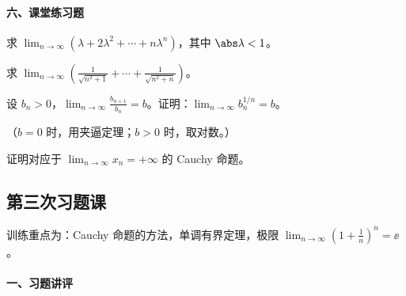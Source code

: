 \paragraph{六、课堂练习题}

\begin{xexercise}[1]
求 $\displaystyle\lim_{n\to\infty}(\lambda+2\lambda^2+\cdots+n\lambda^n)$，其中 $\abs\lambda<1$。
\end{xexercise}

\begin{xexercise}[2]
求 $\displaystyle\lim_{n\to\infty}\left(\frac1{\sqrt{n^2+1}}+\cdots+\frac1{\sqrt{n^2+n}}\right)$。
\end{xexercise}

\begin{xexercise}[3]
设 $b_n>0$，$\displaystyle\lim_{n\to\infty}\frac{b_{n+1}}{b_n}=b$。证明：$\displaystyle\lim_{n\to\infty}b_n^{1/n}=b$。

  （$b=0$ 时，用夹逼定理；$b>0$ 时，取对数。）
\end{xexercise}

\begin{xexercise}[4]
证明对应于 $\displaystyle\lim_{n\to\infty}x_n=+\infty$ 的 Cauchy 命题。
\end{xexercise}

\subsection{第三次习题课}

训练重点为：Cauchy 命题的方法，单调有界定理，极限 $\displaystyle\lim_{n\to\infty}\left(1+\frac1n\right)^n=\ee$。

\paragraph{一、习题讲评}

